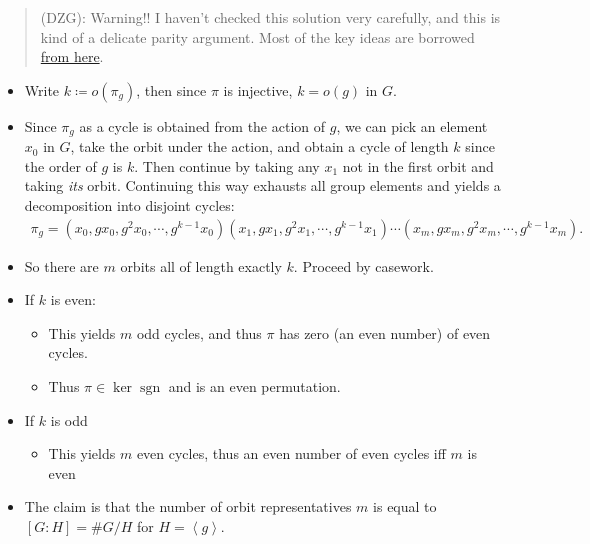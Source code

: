 \begin{solution}

\envlist

\begin{quote}
(DZG): Warning!! I haven't checked this solution very carefully, and
this is kind of a delicate parity argument. Most of the key ideas are
borrowed
\href{https://math.stackexchange.com/questions/3028603/show-that-phig-is-an-even-permutation}{from
here}.
\end{quote}

\begin{itemize}
\tightlist
\item
  Write \(k \coloneqq o(\pi_g)\), then since \(\pi\) is injective,
  \(k = o(g)\) in \(G\).
\item
  Since \(\pi_g\) as a cycle is obtained from the action of \(g\), we
  can pick an element \(x_0\) in \(G\), take the orbit under the action,
  and obtain a cycle of length \(k\) since the order of \(g\) is \(k\).
  Then continue by taking any \(x_1\) not in the first orbit and taking
  \emph{its} orbit. Continuing this way exhausts all group elements and
  yields a decomposition into disjoint cycles:
  \begin{align*}
  \pi_g = 
  (x_0, gx_0, g^2 x_0, \cdots, g^{k-1} x_0)
  (x_1, gx_1, g^2 x_1, \cdots, g^{k-1} x_1)
  \cdots
  (x_m, gx_m, g^2 x_m, \cdots, g^{k-1} x_m)
  .\end{align*}
\item
  So there are \(m\) orbits all of length exactly \(k\). Proceed by
  casework.
\item
  If \(k\) is even:

  \begin{itemize}
  \tightlist
  \item
    This yields \(m\) odd cycles, and thus \(\pi\) has zero (an even
    number) of even cycles.
  \item
    Thus \(\pi \in \ker \operatorname{sgn}\) and is an even permutation.
  \end{itemize}
\item
  If \(k\) is odd

  \begin{itemize}
  \tightlist
  \item
    This yields \(m\) even cycles, thus an even number of even cycles
    iff \(m\) is even
  \end{itemize}
\item
  The claim is that the number of orbit representatives \(m\) is equal
  to \([G:H] = \# G/H\) for \(H = \left\langle{ g }\right\rangle\).


\end{itemize}
\end{solution}
